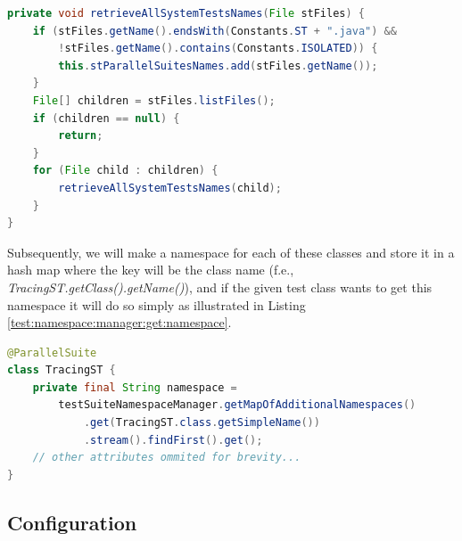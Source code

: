 \begin{lstlisting}[language=Java,label=test:namespace:manager:list:files,caption=Dynamically list all @ParallelSuites,frame=tb]
private void retrieveAllSystemTestsNames(File stFiles) {
    if (stFiles.getName().endsWith(Constants.ST + ".java") &&
        !stFiles.getName().contains(Constants.ISOLATED)) {
        this.stParallelSuitesNames.add(stFiles.getName());
    }
    File[] children = stFiles.listFiles();
    if (children == null) {
        return;
    }
    for (File child : children) {
        retrieveAllSystemTestsNames(child);
    }
}
\end{lstlisting}
Subsequently, we will make a namespace for each of these classes and store it in a hash map where the key will be the class name
(f.e., \emph{TracingST.getClass().getName()}), and if the given test class wants to get this namespace it will do so simply as
illustrated in Listing \ref{test:namespace:manager:get:namespace}.

\begin{lstlisting}[language=Java,label=test:namespace:manager:get:namespace,caption=@ParallelSuite query generated (dynamically) namespace,frame=tb]
@ParallelSuite
class TracingST {
    private final String namespace =
        testSuiteNamespaceManager.getMapOfAdditionalNamespaces()
            .get(TracingST.class.getSimpleName())
            .stream().findFirst().get();
    // other attributes ommited for brevity...
}
\end{lstlisting}

\subsection{Configuration}
\label{05:class:wide:config}

